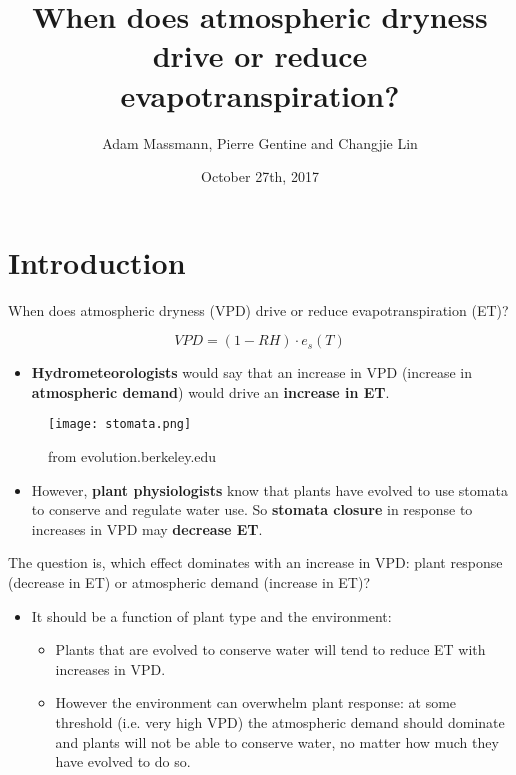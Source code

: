 \documentclass{beamer}
\title[Your Short Title]{When does atmospheric dryness drive or reduce evapotranspiration?}
\author{Adam Massmann,  Pierre Gentine and Changjie Lin}
\institute{EEE Graduate Student Symposium}
\date{October 27th, 2017}
\begin{document}
\begin{frame}
  \titlepage
\end{frame}


\section{Introduction}
\begin{frame}{When does atmospheric dryness (VPD) drive or reduce evapotranspiration (ET)?}
  \begin{Huge}
  \[VPD = (1-RH)\cdot e_s (T)\]
\end{Huge}
  \begin{itemize}
  \item \textbf{Hydrometeorologists} would say that an increase in VPD (increase in \textbf{atmospheric demand}) would drive an \textbf{increase in ET}.
  \end{itemize}
\end{frame}

\begin{frame}%
  \begin{figure}
  \texttt{[image: stomata.png]}%
  \caption{from evolution.berkeley.edu}
\end{figure}
  \begin{itemize}
  \item However, \textbf{plant physiologists} know that plants have evolved to use stomata to conserve and regulate water use. So \textbf{stomata closure} in response to increases in VPD may \textbf{decrease ET}.
  \end{itemize}
\end{frame}


\begin{frame}{The question is, which effect dominates with an increase in VPD: plant response (decrease in ET) or atmospheric demand (increase in ET)?}
  \begin{itemize}
  \item It should be a function of plant type and the environment:
    \begin{itemize}
    \item Plants that are evolved to conserve water will tend to reduce ET with increases in VPD.
    \item However the environment can overwhelm plant response: at some threshold (i.e. very high VPD) the atmospheric demand should dominate and plants will not be able to conserve water, no matter how much they have evolved to do so.
    \end{itemize}
  \end{itemize}
\end{frame}
\end{document}

